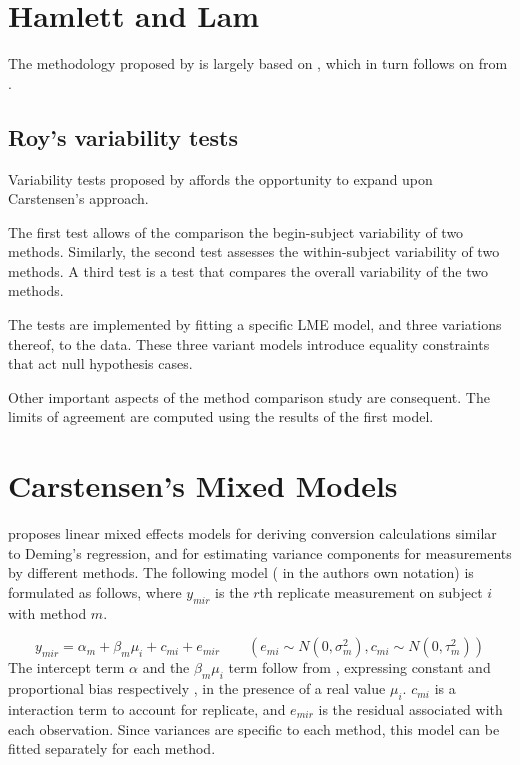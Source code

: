 \documentclass[12pt, a4paper]{report}
\theoremstyle{plain}
\theoremstyle{definition}
\theoremstyle{remark}
\begin{document}
\section{Hamlett and Lam}
The methodology proposed by \citet{Roy2009} is largely based on \citet{hamlett}, which in turn follows on from \citet{lam}.





\subsection{Roy's variability tests}
Variability tests proposed by \citet{Roy2009} affords the opportunity to expand upon Carstensen's approach.

The first test allows of the comparison the begin-subject variability of two methods. Similarly, the second test
assesses the within-subject variability of two methods. A third test is a test that compares the overall variability of the two methods.

The tests are implemented by fitting a specific LME model, and three variations thereof, to the data. These three variant models introduce equality constraints that act null hypothesis cases.

Other important aspects of the method comparison study are consequent. The limits of agreement are computed using the results of the first model.

\newpage
\section{Carstensen's Mixed Models}

\citet{BXC2004} proposes linear mixed effects models for deriving
conversion calculations similar to Deming's regression, and for
estimating variance components for measurements by different
methods. The following model ( in the authors own notation) is
formulated as follows, where $y_{mir}$ is the $r$th replicate
measurement on subject $i$ with method $m$.

\begin{equation}
y_{mir}  = \alpha_{m} + \beta_{m}\mu_{i} + c_{mi} + e_{mir} \qquad
( e_{mi} \sim N(0,\sigma^{2}_{m}), c_{mi} \sim N(0,\tau^{2}_{m}))
\end{equation}
The intercept term $\alpha$ and the $\beta_{m}\mu_{i}$ term follow
from \citet{DunnSEME}, expressing constant and proportional bias
respectively , in the presence of a real value $\mu_{i}.$
$c_{mi}$ is a interaction term to account for replicate, and
$e_{mir}$ is the residual associated with each observation.
Since variances are specific to each method, this model can be
fitted separately for each method.
\end{document}

